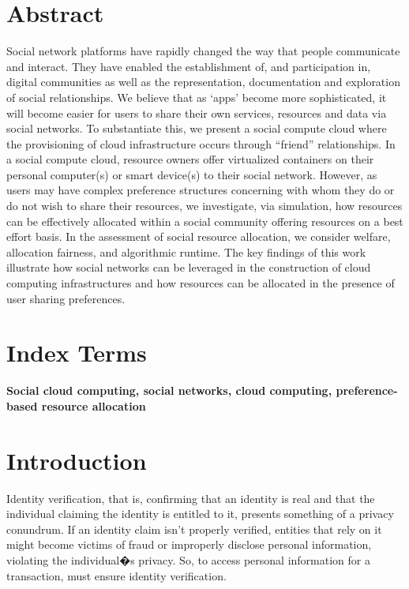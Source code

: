 \documentclass[a4paper,12pt]{article}
\begin{document}
    \newpage
    \tableofcontents
    \listoffigures
    \newpage
    \section{Abstract}
	Social network platforms have rapidly changed the way that people communicate and interact. They have enabled the
	establishment of, and participation in, digital communities as well as the representation, documentation and exploration of social
	relationships. We believe that as ‘apps’ become more sophisticated, it will become easier for users to share their own services,
	resources and data via social networks. To substantiate this, we present a social compute cloud where the provisioning of cloud
	infrastructure occurs through “friend” relationships. In a social compute cloud, resource owners offer virtualized containers on their
	personal computer(s) or smart device(s) to their social network. However, as users may have complex preference structures
	concerning with whom they do or do not wish to share their resources, we investigate, via simulation, how resources can be effectively
	allocated within a social community offering resources on a best effort basis. In the assessment of social resource allocation, we
	consider welfare, allocation fairness, and algorithmic runtime. The key findings of this work illustrate how social networks can be
	leveraged in the construction of cloud computing infrastructures and how resources can be allocated in the presence of user sharing
	preferences.
    \section{Index Terms}
	\textbf{Social cloud computing, social networks, cloud computing, preference-based resource allocation}
    \section{Introduction}
            Identity verification, that is, confirming that an identity is real and that the individual claiming the identity is entitled to it, presents something of a privacy conundrum.
            If an identity claim isn't properly verified, entities that rely on it might become victims of fraud or improperly disclose personal information, violating the individual�s privacy.
            So, to access personal information for a transaction, must ensure identity verification.
\end{document}
